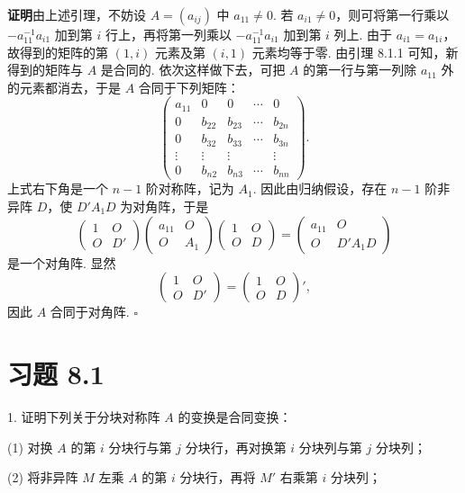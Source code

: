 \documentclass[UTF8, 12pt, fontset=fandol, oneside]{ctexart}
\begin{document}
\noindent\textbf{证明}\quad 由上述引理，不妨设 $A=(a_{ij})$ 中 $a_{11}\neq0$. 若 $a_{i1}\neq0$，则可将第一行乘以 $-a_{11}^{-1}a_{i1}$ 加到第 $i$ 行上，再将第一列乘以 $-a_{11}^{-1}a_{i1}$ 加到第 $i$ 列上. 由于 $a_{i1}=a_{1i}$，故得到的矩阵的第 $(1,i)$ 元素及第 $(i,1)$ 元素均等于零. 由引理 8.1.1 可知，新得到的矩阵与 $A$ 是合同的. 依次这样做下去，可把 $A$ 的第一行与第一列除 $a_{11}$ 外的元素都消去，于是 $A$ 合同于下列矩阵：
\[
\left(\begin{array}{ccccc}
a_{11}&0&0&\cdots&0\\
0&b_{22}&b_{23}&\cdots&b_{2n}\\
0&b_{32}&b_{33}&\cdots&b_{3n}\\
\vdots&\vdots&\vdots&&\vdots\\
0&b_{n2}&b_{n3}&\cdots&b_{nn}
\end{array}\right).
\]
上式右下角是一个 $n-1$ 阶对称阵，记为 $A_1$. 因此由归纳假设，存在 $n-1$ 阶非异阵 $D$，使 $D'A_1D$ 为对角阵，于是
\[
\left(\begin{array}{cc}
1&O\\
O&D'
\end{array}\right)
\left(\begin{array}{cc}
a_{11}&O\\
O&A_1
\end{array}\right)
\left(\begin{array}{cc}
1&O\\
O&D
\end{array}\right)
=
\left(\begin{array}{cc}
a_{11}&O\\
O&D'A_1D
\end{array}\right)
\]
是一个对角阵. 显然
\[
\left(\begin{array}{cc}
1&O\\
O&D'
\end{array}\right)
=
\left(\begin{array}{cc}
1&O\\
O&D
\end{array}\right)' ,
\]
因此 $A$ 合同于对角阵. $\square$

\section*{习题 8.1}

1. 证明下列关于分块对称阵 $A$ 的变换是合同变换：

(1) 对换 $A$ 的第 $i$ 分块行与第 $j$ 分块行，再对换第 $i$ 分块列与第 $j$ 分块列；

(2) 将非异阵 $M$ 左乘 $A$ 的第 $i$ 分块行，再将 $M'$ 右乘第 $i$ 分块列；
\end{document}
